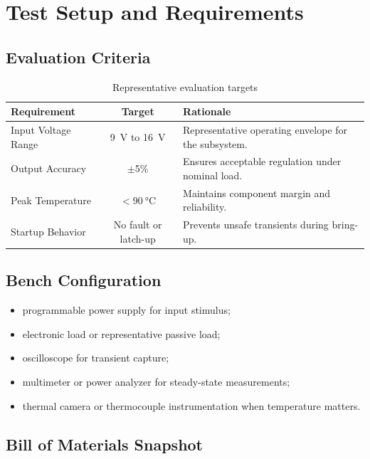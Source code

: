 \section{Test Setup and Requirements}

\subsection{Evaluation Criteria}
\begin{table}[H]
    \centering
    \small
    \begin{tabular}{l c p{7.2cm}}
        \toprule
        \textbf{Requirement} & \textbf{Target} & \textbf{Rationale} \\
        \midrule
        Input Voltage Range & \SI{9}{\volt} to \SI{16}{\volt} & Representative operating envelope for the subsystem. \\
        Output Accuracy & $\pm$5\% & Ensures acceptable regulation under nominal load. \\
        Peak Temperature & $< \SI{90}{\celsius}$ & Maintains component margin and reliability. \\
        Startup Behavior & No fault or latch-up & Prevents unsafe transients during bring-up. \\
        \bottomrule
    \end{tabular}
    \caption{Representative evaluation targets}
    \label{tab:requirements}
\end{table}

\subsection{Bench Configuration}
\begin{itemize}
    \item programmable power supply for input stimulus;
    \item electronic load or representative passive load;
    \item oscilloscope for transient capture;
    \item multimeter or power analyzer for steady-state measurements;
    \item thermal camera or thermocouple instrumentation when temperature matters.
\end{itemize}


\subsection{Bill of Materials Snapshot}
